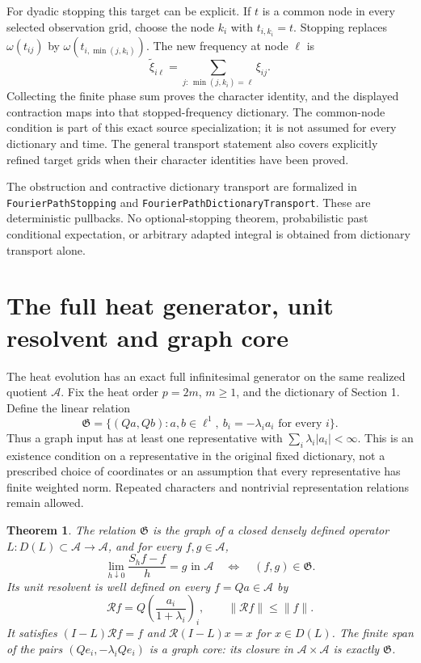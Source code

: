\documentclass[11pt]{article}
\newtheorem{theorem}{Theorem}[section]
\theoremstyle{remark}\newtheorem{remark}[theorem]{Remark}
\newcommand{\A}{\mathcal A}\newcommand{\X}{\mathcal X}
\newcommand{\code}[1]{{\small\nolinkurl{#1}}}
\begin{document}
For dyadic stopping this target can be explicit. If $t$ is a common
node in every selected observation grid, choose the node $k_i$ with
$t_{i,k_i}=t$. Stopping replaces $\omega(t_{ij})$ by
$\omega(t_{i,\min(j,k_i)})$. The new frequency at node $\ell$ is
\[
 \widetilde\xi_{i\ell}=
       \sum_{j:\,\min(j,k_i)=\ell}\xi_{ij}.
\]
Collecting the finite phase sum proves the character identity, and
the displayed contraction maps into that stopped-frequency
dictionary. The common-node condition is part of this exact source
specialization; it is not assumed for every dictionary and time.
The general transport statement also covers explicitly refined
target grids when their character identities have been proved.

The obstruction and contractive dictionary transport are formalized
in \code{FourierPathStopping} and
\code{FourierPathDictionaryTransport}. These are deterministic
pullbacks. No optional-stopping theorem, probabilistic past
conditional expectation, or arbitrary adapted integral is obtained
from dictionary transport alone.


\section{The full heat generator, unit resolvent and graph core}
The heat evolution has an exact full infinitesimal generator on the
same realized quotient $\A$. Fix the heat order $p=2m$, $m\geq1$,
and the dictionary of Section 1. Define the linear relation
\begin{equation}\label{eq:heat-generator-graph}
 \mathfrak G=\{(Qa,Qb):a,b\in\ell^1,
                      \ b_i=-\lambda_i a_i\text{ for every }i\}.
\end{equation}
Thus a graph input has at least one representative with
$\sum_i\lambda_i|a_i|<\infty$. This is an existence condition on a
representative in the original fixed dictionary, not a prescribed
choice of coordinates or an assumption that every representative
has finite weighted norm. Repeated characters and nontrivial
representation relations remain allowed.

\begin{theorem}\label{thm:full-heat-generator}
The relation $\mathfrak G$ is the graph of a closed densely defined
operator $L:D(L)\subset\A\to\A$, and for every $f,g\in\A$,
\begin{equation}\label{eq:heat-full-generator}
 \lim_{h\downarrow0}\frac{S_hf-f}{h}=g\text{ in }\A
 \quad\Longleftrightarrow\quad (f,g)\in\mathfrak G.
\end{equation}
Its unit resolvent is well defined on every $f=Qa\in\A$ by
\begin{equation}\label{eq:heat-unit-resolvent}
 \mathcal R f=Q\left(\frac{a_i}{1+\lambda_i}\right)_i,
 \qquad \|\mathcal R f\|\leq\|f\|.
\end{equation}
It satisfies $(I-L)\mathcal R f=f$ and
$\mathcal R(I-L)x=x$ for $x\in D(L)$. The finite span of the
pairs $(Qe_i,-\lambda_iQe_i)$ is a graph core: its closure in
$\A\times\A$ is exactly $\mathfrak G$.
\end{theorem}
\end{document}

